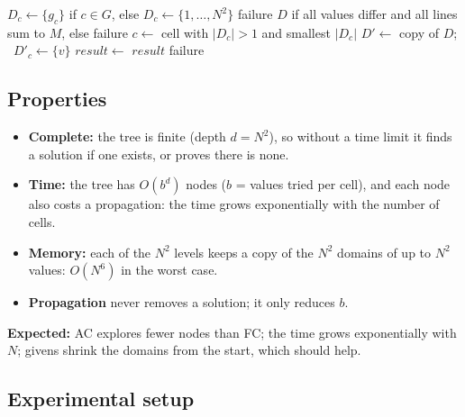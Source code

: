 \documentclass[11pt,a4paper]{article}
\begin{document}
\begin{algorithm}[H]
\small
\caption{Backtracking with constraint propagation}
\label{alg:bt}
\begin{algorithmic}[1]
  \State $D_c\gets\{g_c\}$ if $c\in G$, else $D_c\gets\{1,\dots,N^2\}$
   \State \Return failure \EndIf
  \State \Return {}
\EndFunction
\Statex
{}
    \State \Return $D$ if all values differ and all lines sum to $M$, else failure
  \EndIf
  \State $c\gets$ cell with $|D_c|>1$ and smallest $|D_c|$
    \State $D'\gets$ copy of $D$; \ $D'_c\gets\{v\}$
      \State $result\gets$ 
       \State \Return $result$ \EndIf
    \EndIf
  \EndFor
  \State \Return failure
\EndFunction
\end{algorithmic}
\end{algorithm}

\subsection{Properties}

\begin{itemize}[nosep]
  \item \textbf{Complete:} the tree is finite (depth $d=N^2$), so without
        a time limit it finds a solution if one exists, or proves there is
        none.
  \item \textbf{Time:} the tree has $O(b^d)$ nodes ($b$ = values tried per
        cell), and each node also costs a propagation: the time grows
        exponentially with the number of cells.
  \item \textbf{Memory:} each of the $N^2$ levels keeps a copy of the $N^2$
        domains of up to $N^2$ values: $O(N^6)$ in the worst case.
  \item \textbf{Propagation} never removes a solution; it only reduces $b$.
\end{itemize}
\noindent\textbf{Expected:} AC explores fewer nodes than FC; the time
grows exponentially with $N$; givens shrink the domains from the start,
which should help.

\subsection{Experimental setup}
\end{document}
